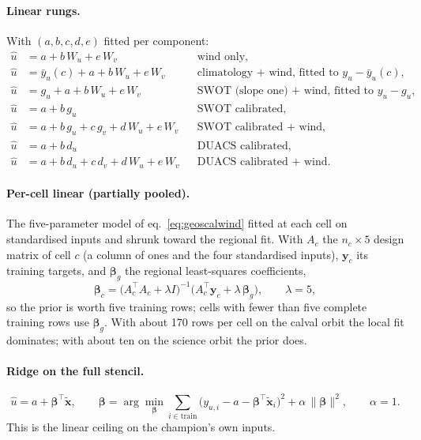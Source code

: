 \documentclass[11pt]{article}
\begin{document}
\paragraph{Linear rungs.} With $(a, b, c, d, e)$ fitted per component:
\begin{align}
\hat u &= a + b\,W_u + e\,W_v && \text{wind only,} \label{eq:wind}\\
\hat u &= \bar y_u(c) + a + b\,W_u + e\,W_v && \text{climatology + wind, fitted to } y_u - \bar y_u(c), \label{eq:climwind}\\
\hat u &= g_u + a + b\,W_u + e\,W_v && \text{SWOT (slope one) + wind, fitted to } y_u - g_u, \label{eq:geoswind}\\
\hat u &= a + b\,g_u && \text{SWOT calibrated,} \label{eq:geoscal}\\
\hat u &= a + b\,g_u + c\,g_v + d\,W_u + e\,W_v && \text{SWOT calibrated + wind,} \label{eq:geoscalwind}\\
\hat u &= a + b\,d_u && \text{DUACS calibrated,} \label{eq:duacscal}\\
\hat u &= a + b\,d_u + c\,d_v + d\,W_u + e\,W_v && \text{DUACS calibrated + wind.} \label{eq:duacscalwind}
\end{align}

\paragraph{Per-cell linear (partially pooled).}
The five-parameter model of eq.~\ref{eq:geoscalwind} fitted at each cell on
standardised inputs and shrunk toward the regional fit. With $A_c$ the
$n_c \times 5$ design matrix of cell $c$ (a column of ones and the four
standardised inputs), $\mathbf{y}_c$ its training targets, and
$\boldsymbol\beta_g$ the regional least-squares coefficients,
\begin{equation}
\boldsymbol\beta_c = \big(A_c^{\top}A_c + \lambda I\big)^{-1}
\big(A_c^{\top}\mathbf{y}_c + \lambda\,\boldsymbol\beta_g\big),
\qquad \lambda = 5,
\label{eq:celllinear}
\end{equation}
so the prior is worth five training rows; cells with fewer than five complete
training rows use $\boldsymbol\beta_g$. With about 170 rows per cell on the
calval orbit the local fit dominates; with about ten on the science orbit the
prior does.

\paragraph{Ridge on the full stencil.}
\begin{equation}
\hat u = a + \boldsymbol\beta^{\top}\tilde{\mathbf{x}},
\qquad
\boldsymbol\beta = \arg\min_{\boldsymbol\beta}
\sum_{i \in \text{train}} \big(y_{u,i} - a - \boldsymbol\beta^{\top}\tilde{\mathbf{x}}_i\big)^2
+ \alpha\,\|\boldsymbol\beta\|^2,
\qquad \alpha = 1.
\label{eq:ridge}
\end{equation}
This is the linear ceiling on the champion's own inputs.
\end{document}
